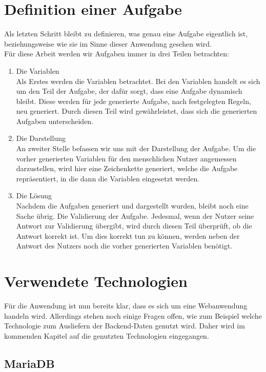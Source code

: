 \section{Definition einer Aufgabe}

Als letzten Schritt bleibt zu definieren, was genau eine Aufgabe eigentlich ist, beziehungsweise wie sie im Sinne dieser Anwendung gesehen wird. \\
Für diese Arbeit werden wir Aufgaben immer in drei Teilen betrachten:
\begin{enumerate}
\itemsep0em
\item Die Variablen \\
Als Erstes werden die Variablen betrachtet. Bei den Variablen handelt es sich um den Teil der Aufgabe, der dafür sorgt, dass eine Aufgabe dynamisch bleibt. Diese werden für jede generierte Aufgabe, nach festgelegten Regeln, neu generiert. Durch diesen Teil wird gewährleistet, dass sich die generierten Aufgaben unterscheiden.
\item Die Darstellung \\
An zweiter Stelle befassen wir uns mit der Darstellung der Aufgabe. Um die vorher generierten Variablen für den menschlichen Nutzer angemessen darzustellen, wird hier eine Zeichenkette generiert, welche die Aufgabe repräsentiert, in die dann die Variablen eingesetzt werden.
\item Die Lösung \\
Nachdem die Aufgaben generiert und dargestellt wurden, bleibt noch eine Sache übrig. Die Validierung der Aufgabe. Jedesmal, wenn der Nutzer seine Antwort zur Validierung übergibt, wird durch diesen Teil überprüft, ob die Antwort korrekt ist. Um dies korrekt tun zu können, werden neben der Antwort des Nutzers noch die vorher generierten Variablen benötigt.
\end{enumerate}

\section{Verwendete Technologien}

Für die Anwendung ist nun bereits klar, dass es sich um eine Webanwendung handeln wird. Allerdings stehen noch einige Fragen offen, wie zum Beispiel welche Technologie zum Ausliefern der Backend-Daten genutzt wird. Daher wird im kommenden Kapitel auf die genutzten Technologien eingegangen.

\subsection{MariaDB}


